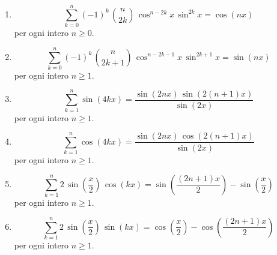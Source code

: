 \documentclass[11pt,a4paper]{article}
\begin{document}
\begin{enumerate}
{\small per ogni intero $n\ge 1$.}
\item \[ \sum_{k=0}^{n} \left(-1\right)^{k}\,\binom{n}{2k}\,\cos^{n - 2k} x\,\sin^{2k} x = \cos\left(n x\right) \]
{\small per ogni intero $n\ge 0$.}
\item \[ \sum_{k=0}^{n} \left(-1\right)^{k}\,\binom{n}{2k + 1}\,\cos^{n - 2k - 1} x\,\sin^{2k + 1} x = \sin\left(n x\right) \]
{\small per ogni intero $n\ge 1$.}
\item \[ \sum_{k=1}^{n} \sin\left(4k x\right) = \frac{\sin\left(2n x\right)\,\sin\left(2\left(n + 1\right)x\right)}{\sin\left(2x\right)} \]
{\small per ogni intero $n\ge 1$.}
\item \[ \sum_{k=1}^{n} \cos\left(4k x\right) = \frac{\sin\left(2n x\right)\,\cos\left(2\left(n + 1\right)x\right)}{\sin\left(2x\right)} \]
{\small per ogni intero $n\ge 1$.}
\item \[ \sum_{k=1}^{n} 2\,\sin\left(\frac{x}{2}\right)\,\cos\left(k x\right) = \sin\left(\frac{\left(2n + 1\right)x}{2}\right) - \sin\left(\frac{x}{2}\right) \]
{\small per ogni intero $n\ge 1$.}
\item \[ \sum_{k=1}^{n} 2\,\sin\left(\frac{x}{2}\right)\,\sin\left(k x\right) = \cos\left(\frac{x}{2}\right) - \cos\left(\frac{\left(2n + 1\right)x}{2}\right) \]
{\small per ogni intero $n\ge 1$.}
\end{enumerate}
\end{document}
